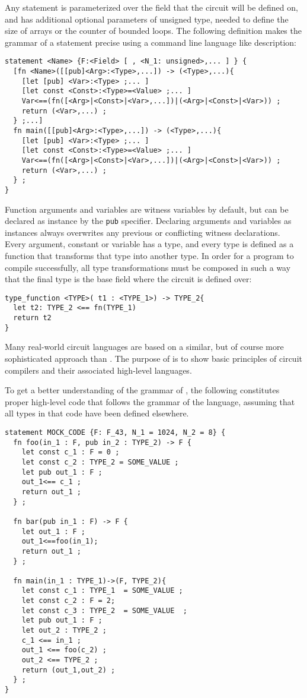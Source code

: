 Any statement is parameterized over the field that the circuit will be defined on, and has additional optional parameters of unsigned type, needed to define the size of arrays or the counter of bounded loops. The following definition makes the grammar of a statement precise using a command line language like description: 
\begin{lstlisting}
statement <Name> {F:<Field> [ , <N_1: unsigned>,... ] } {
  [fn <Name>([[pub]<Arg>:<Type>,...]) -> (<Type>,...){
    [let [pub] <Var>:<Type> ;... ]
    [let const <Const>:<Type>=<Value> ;... ]
    Var<==(fn([<Arg>|<Const>|<Var>,...])|(<Arg>|<Const>|<Var>)) ;
    return (<Var>,...) ;
  } ;...]
  fn main([[pub]<Arg>:<Type>,...]) -> (<Type>,...){
    [let [pub] <Var>:<Type> ;... ]
    [let const <Const>:<Type>=<Value> ;... ]
    Var<==(fn([<Arg>|<Const>|<Var>,...])|(<Arg>|<Const>|<Var>)) ;
    return (<Var>,...) ;
  } ;
}
\end{lstlisting}
Function arguments and variables are witness variables by default, but can be declared as instance by the \texttt{pub} specifier. Declaring arguments and variables as instances always overwrites any previous or conflicting witness declarations. Every argument, constant or variable has a type, and every type is defined as a function that transforms that type into another type. In order for a  program to compile successfully, all type transformations must be composed in such a way that the final type is the base field where the circuit is defined over: 
\begin{lstlisting}
type_function <TYPE>( t1 : <TYPE_1>) -> TYPE_2{
  let t2: TYPE_2 <== fn(TYPE_1)
  return t2
}
\end{lstlisting}
Many real-world circuit languages are based on a similar, but of course more sophisticated approach than . The purpose of  is to show basic principles of circuit compilers and their associated high-level languages.
\begin{example}To get a better understanding of the grammar of , the following constitutes proper high-level code that follows the grammar of the  language, assuming that all types in that code have been defined elsewhere. 
\begin{lstlisting}
statement MOCK_CODE {F: F_43, N_1 = 1024, N_2 = 8} {
  fn foo(in_1 : F, pub in_2 : TYPE_2) -> F {
    let const c_1 : F = 0 ;
    let const c_2 : TYPE_2 = SOME_VALUE ;
    let pub out_1 : F ;
    out_1<== c_1 ;
    return out_1 ;
  } ;
  
  fn bar(pub in_1 : F) -> F {
    let out_1 : F ;
    out_1<==foo(in_1);
    return out_1 ;
  } ;
    
  fn main(in_1 : TYPE_1)->(F, TYPE_2){
    let const c_1 : TYPE_1  = SOME_VALUE ;
    let const c_2 : F = 2;
    let const c_3 : TYPE_2  = SOME_VALUE  ;
    let pub out_1 : F ;
    let out_2 : TYPE_2 ;
    c_1 <== in_1 ;
    out_1 <== foo(c_2) ;
    out_2 <== TYPE_2 ;
    return (out_1,out_2) ;
  } ;
}
\end{lstlisting}
\end{example}
